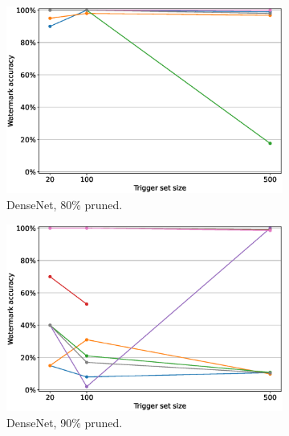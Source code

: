 \begin{figure}
    \centering
    \begin{subfigure}{0.4\linewidth}
        \includegraphics[width=\linewidth]{images/pruning/densenet_pruning_per_arch_08.eps}
        \caption{DenseNet, 80\% pruned.}
        \label{fig:pruning-0.8-densenet}
    \end{subfigure}
    \quad
    \begin{subfigure}{0.4\linewidth}
        \includegraphics[width=\linewidth]{images/pruning/densenet_pruning_per_arch_09.eps}
        \caption{DenseNet, 90\% pruned.}
        \label{fig:pruning-0.9-densenet}
    \end{subfigure}
    \quad
    \begin{subfigure}{0.4\linewidth}

\end{subfigure}
\end{figure}
